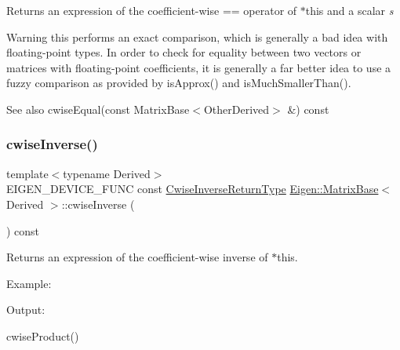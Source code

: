 \begin{DoxyReturn}{Returns}
an expression of the coefficient-\/wise == operator of {\ttfamily $\ast$this} and a scalar {\itshape s} 
\end{DoxyReturn}
\begin{DoxyWarning}{Warning}
this performs an exact comparison, which is generally a bad idea with floating-\/point types. In order to check for equality between two vectors or matrices with floating-\/point coefficients, it is generally a far better idea to use a fuzzy comparison as provided by is\+Approx() and is\+Much\+Smaller\+Than().
\end{DoxyWarning}
\begin{DoxySeeAlso}{See also}
cwise\+Equal(const Matrix\+Base$<$\+Other\+Derived$>$ \&) const 
\end{DoxySeeAlso}
\mbox{\label{class_eigen_1_1_matrix_base_a96b087bbb06422f11b03a0e529064e31}} 
\subsubsection{\texorpdfstring{cwiseInverse()}{cwiseInverse()}}
{\footnotesize\ttfamily template$<$typename Derived$>$ \\
E\+I\+G\+E\+N\+\_\+\+D\+E\+V\+I\+C\+E\+\_\+\+F\+U\+NC const \mbox{\hyperlink{class_eigen_1_1_cwise_unary_op}{Cwise\+Inverse\+Return\+Type}} \mbox{\hyperlink{class_eigen_1_1_matrix_base}{Eigen\+::\+Matrix\+Base}}$<$ Derived $>$\+::cwise\+Inverse (\begin{DoxyParamCaption}{ }\end{DoxyParamCaption}) const\hspace{0.3cm}{\ttfamily [inline]}}

\begin{DoxyReturn}{Returns}
an expression of the coefficient-\/wise inverse of $\ast$this.
\end{DoxyReturn}
Example\+: 
\begin{DoxyCodeInclude}{0}
\end{DoxyCodeInclude}
 Output\+: 
\begin{DoxyVerbInclude}
\end{DoxyVerbInclude}
 cwise\+Product() \mbox{\label{class_eigen_1_1_matrix_base_aef908389c90ade88aafefd7e8f7b024e}} 
